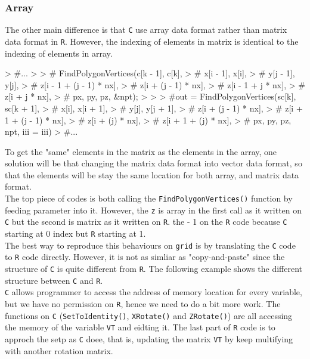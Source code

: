 \documentclass[paper=a4, fontsize=11pt]{report}
\begin{document}
\subsubsection{Array}
The other main difference is that \texttt{C} use array data format rather than matrix data format in \texttt{R}. However, the indexing of elements in matrix is identical to the indexing of elements in array. 
\begin{Schunk}
\begin{Sinput}
> #...
> 
> # FindPolygonVertices(c[k - 1], c[k],
> #         x[i - 1], x[i],
> #         y[j - 1], y[j],
> #         z[i - 1 + (j - 1) * nx],
> #         z[i + (j - 1) * nx],
> #         z[i - 1 + j * nx],
> #         z[i + j * nx],
> #         px, py, pz, &npt);
> 	    
> 
> #out = FindPolygonVertices(sc[k], sc[k + 1],
> #        x[i], x[i + 1],
> #        y[j], y[j + 1],
> #        z[i + (j - 1) * nx],
> #        z[i + 1 + (j - 1) * nx],
> #        z[i + (j) * nx],
> #        z[i + 1 + (j) * nx],
> #        px, py, pz, npt, iii = iii)
> #...
\end{Sinput}
\end{Schunk}
To get the "same" elements in the matrix as the elements in the array, one solution will be that changing the matrix data format into vector data format, so that the elements will be stay the same location for both array, and matrix data format.\\

The top piece of codes is both calling the \texttt{FindPolygonVertices()} function by feeding parameter into it. However, the \texttt{z} is array in the first call as it written on \texttt{C} but the second is matrix as it written on \texttt{R}. the - 1 on the \texttt{R} code because \texttt{C} starting at 0 index but \texttt{R} starting at 1.\\

The best way to reproduce this behaviours on \texttt{grid} is by translating the \texttt{C} code to \texttt{R} code directly. However, it is not as simliar as "copy-and-paste" since the structure of \texttt{C} is quite different from \texttt{R}. The following example shows the different structure between \texttt{C} and \texttt{R}.  \\

\texttt{C} allows programmer to access the address of memory location for every variable, but we have no permission on \texttt{R}, hence we need to do a bit more work. The functions on \texttt{C} (\texttt{SetToIdentity()}, \texttt{XRotate()} and \texttt{ZRotate()}) are all accessing the memory of the variable \texttt{VT} and eidting it. The last part of \texttt{R} code is to approch the setp as \texttt{C} doee, that is, updating the matrix \texttt{VT} by keep multifying with another rotation matrix.\\
\end{document}

